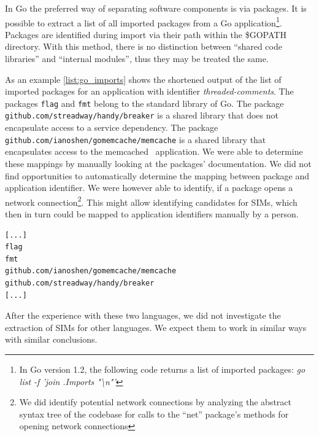 
In Go the preferred way of separating software components is via packages. It is possible to extract a list of all imported packages from a Go application\footnote{In Go version 1.2, the following code returns a list of imported packages: \newline \emph{go list -f '{{join .Imports "\textbackslash n"}}'}}. Packages are identified during import via their path within the \$GOPATH directory. With this method, there is no distinction between ``shared code libraries'' and ``internal modules'', thus they may be treated the same.

As an example \autoref{list:go_imports} shows the shortened output of the list of imported packages for an application with identifier \emph{threaded-comments}. The packages \lstinline{flag} and \lstinline{fmt} belong to the standard library of Go. The package \lstinline{github.com/streadway/handy/breaker} is a shared library that does not encapsulate access to a service dependency. The package \lstinline{github.com/ianoshen/gomemcache/memcache} is a shared library that encapsulates access to the memcached~\cite{memcached} application. We were able to determine these mappings by manually looking at the packages' documentation. We did not find opportunities to automatically determine the mapping between package and application identifier. We were however able to identify, if a package opens a network connection\footnote{We did identify potential network connections by analyzing the abstract syntax tree of the codebase for calls to the ``net'' package's methods for opening network connections}. This might allow identifying candidates for SIMs, which then in turn could be mapped to application identifiers manually by a person.


\begin{lstlisting}[caption=Shortened list of imported packages of the thread-comments application,label=list:go_imports]
[...]
flag
fmt
github.com/ianoshen/gomemcache/memcache
github.com/streadway/handy/breaker
[...]
\end{lstlisting}

After the experience with these two languages, we did not investigate the extraction of SIMs for other languages. We expect them to work in similar ways with similar conclusions.


